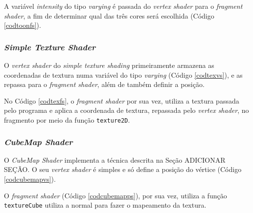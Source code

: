 	

	A variável \textit{intensity} do tipo \textit{varying} é passada do \textit{vertex shader} para o \textit{fragment shader}, a fim de determinar qual das três cores será escolhida (Código \ref{codtoonfs}). 
  
 	

\subsubsection{\textit{Simple Texture Shader}}

	O \textit{vertex shader} do \textit{simple texture shading} primeiramente armazena as coordenadas de textura numa variável do tipo \textit{varying} (Código \ref{codtexvs}), e as repassa para o \textit{fragment shader}, além de também definir a posição.  

	

	No Código \ref{codtexfs}, o \textit{fragment shader} por sua vez, utiliza a textura passada pelo programa e aplica a coordenada de textura, repassada pelo \textit{vertex shader}, no fragmento por meio da função  \texttt{texture2D}.

	

\subsubsection{\textit{CubeMap Shader}}	

	 O \textit{CubeMap Shader} implementa a técnica descrita na Seção ADICIONAR SEÇÃO. O seu  \textit{vertex shader} é simples e só define a posição do vértice (Código \ref{codcubemapvs}). 

	

	O  \textit{fragment shader} (Código \ref{codcubemapps}), por sua vez, utiliza a função \texttt{textureCube} utiliza a normal para fazer o mapeamento da textura. 

